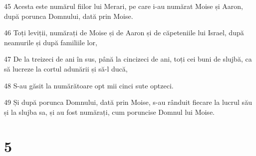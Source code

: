 \par 45 Acesta este numărul fiilor lui Merari, pe care i-au numărat Moise și Aaron, după porunca Domnului, dată prin Moise.
\par 46 Toți leviții, numărați de Moise și de Aaron și de căpeteniile lui Israel, după neamurile și după familiile lor,
\par 47 De la treizeci de ani în sus, până la cincizeci de ani, toți cei buni de slujbă, ca să lucreze la cortul adunării și să-l ducă,
\par 48 S-au găsit la numărătoare opt mii cinci sute optzeci.
\par 49 Și după porunca Domnului, dată prin Moise, s-au rânduit fiecare la lucrul său și la slujba sa, și au fost numărați, cum poruncise Domnul lui Moise.

\chapter{5}

